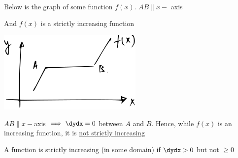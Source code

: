 \documentclass[14pt,fleqn]{extarticle}
\begin{document}
 
\begin{snippet}
    
    \incorrect
    
    Below is the graph of some function $f(x)$. $AB \parallel x-$ axis\newline 
    
    And $f(x)$ is a strictly increasing function 
    
    \begin{center}
\includegraphics[scale=1.5]{figure.svg}
\end{center}
    \reason
    
    $AB \parallel x-$axis $\implies \dydx = 0$ between $A$ and $B$. Hence, while $f(x)$ is an increasing function, it is \underline{not strictly increasing}\newline 
    
    A function is strictly increasing (in some domain) if $\dydx > 0$ but not $\geq 0$ 
    
\end{snippet} 
\end{document}
